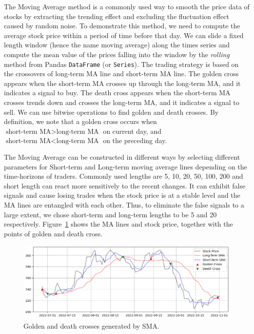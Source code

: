 \documentclass[a4paper, 11pt]{my-elegantpaper}
\begin{document}
The Moving Average method is a commonly used way to smooth the price data of stocks by extracting the trending effect and excluding the fluctuation effect caused by random noise. To demonstrate this method, we need to compute the average stock price within a period of time before that day. We can slide a fixed length window (hence the name moving average) along the times series and compute the mean value of the prices falling into the window by the \textit{rolling} method from Pandas \texttt{DataFrame} (or \texttt{Series}). The trading strategy is based on the crossovers of long-term MA line and short-term MA line. The golden cross appears when the short-term MA crosses up through the long-term MA, and it indicates a signal to buy. The death cross appears when the short-term MA crosses trends down and crosses the long-term MA, and it indicates a signal to sell. We can use bitwise operations to find golden and death crosses. By definition, we note that a golden cross occurs when $\text{short-term MA} > \text{long-term MA}$ on current day, and $\text{short-term MA} < \text{long-term MA}$ on the preceding day.

The Moving Average can be constructed in different ways by selecting different parameters for Short-term and Long-term moving average lines depending on the time-horizons of traders. Commonly used lengths are 5, 10, 20, 50, 100, 200 and short length can react more sensitively to the recent changes. It can exhibit false signals and cause losing trades when the stock price is at a stable level and the MA lines are entangled with each other. Thus, to eliminate the false signals to a large extent, we chose short-term and long-term lengths to be 5 and 20 respectively. Figure~\ref{fig:4} shows the MA lines and stock price, together with the points of golden and death cross.

\begin{figure}[H]
    \centering
    \includegraphics[scale=0.5]{figures/sma.png}
    \caption{Golden and death crosses generated by SMA.}
    \label{fig:4}
\end{figure}
\end{document}
